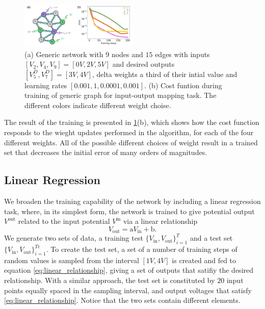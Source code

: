 \documentclass[reprint,superscriptaddress,prb,showkeys]{revtex4-2}
\begin{document}
\begin{figure}[h]
    \centering
    \includegraphics[width=0.5\textwidth]{plots/general_network/mse_general.pdf}
    \caption{(a) Generic network with $9$ nodes and $15$ edges with inputs $[V_{2}, V_{4}, V_{9}] = [0V, 2V, 5V]$ and desired outputs $[V_{5}^D, V_{7}^D] = [3V, 4V]$, delta weights a third of their intial value and learning rates $[0.001, 1, 0.0001, 0.001]$. (b) Cost funtion during training of generic graph for input-output mapping task. The different colors indicate different weight choise.}\label{fig:mse_general}
\end{figure} 

The result of the training is presented in \cref{fig:mse_general}(b), which shows how the cost function responds to the wieght updates performed in the algorithm, for each of the four different weights. All of the possible different choices of weight result in a trained set that decreases the initial error of many orders of magnitudes. 

\subsection{Linear Regression}

We broaden the training capability of the network by including a linear regression task, where, in its simplest form, the network is trained to give potential output $V^{\text{out}}$ related to the input potential $V^{\text{in}}$ via a linear relationship
\begin{equation}
    V_{\text{out}} = \text{a} V_{\text{in}} + \text{b}.
\label{eq:linear_relationship}
\end{equation}
We generate two sets of data, a training test $ \{ V_{\text{in}}, V_{\text{out}} \}_{i=1}^{T}$ and a test set $\{ V_{\text{in}}, V_{\text{out}} \}_{i=1}^{Te}$. To create the test set, a set of a number of training steps of random values is sampled from the interval $[1V, 4V]$ is created and fed to equation \cref{eq:linear_relationship}, giving a set of outputs that satifiy the desired relationship. With a similar approach, the test set is constituted by $20$ input points equally spaced in the sampling interval, and output voltages that satisfy \cref{eq:linear_relationship}. Notice that the two sets contain different elements.
\end{document}
